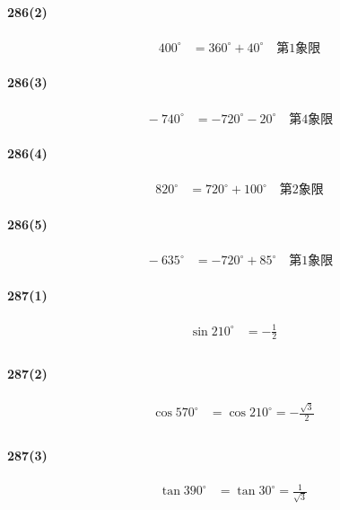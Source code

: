 \documentclass[fleqn,a4j,dvipdfmx,uplatex,twocolumn]{jsarticle}
\begin{document}
\paragraph{286(2)}
\begin{align*}
  \quad 400^{\circ} &= 360^{\circ} + 40^{\circ} \quad \text{第1象限}
\end{align*}

\paragraph{286(3)}
\begin{align*}
  \quad -740^{\circ} &= -720^{\circ} - 20^{\circ} \quad \text{第4象限}
\end{align*}

\paragraph{286(4)}
\begin{align*}
  \quad 820^{\circ} &= 720^{\circ} + 100^{\circ} \quad \text{第2象限}
\end{align*}

\paragraph{286(5)}
\begin{align*}
  \quad -635^{\circ} &= -720^{\circ} + 85^{\circ} \quad \text{第1象限}
\end{align*}

\paragraph{287(1)}
\begin{align*}
   \sin 210^{\circ} &= -\frac{1}{2} \\
\end{align*}

\paragraph{287(2)}
\begin{align*}
  \cos 570^{\circ} &= \cos 210^{\circ} = -\frac{\sqrt{3}}{2} \\
\end{align*}

\paragraph{287(3)}
\begin{align*}
  \tan 390^{\circ} &= \tan 30^{\circ} = \frac{1}{\sqrt{3}} \\
\end{align*}
\end{document}
